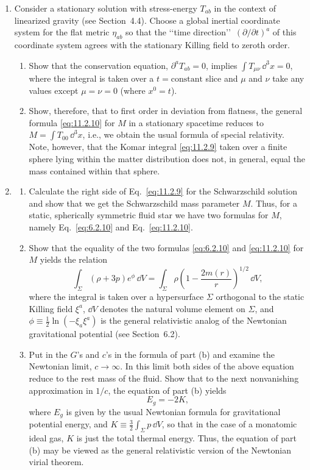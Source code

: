 \begin{enumerate}[label=\arabic*.,leftmargin=2em,itemsep=1.2ex]
\item
Consider a stationary solution with stress-energy \(T_{ab}\) in the context of
linearized gravity (see Section~4.4). Choose a global inertial coordinate system for
the flat metric \(\eta_{ab}\) so that the \lq\lq time direction\rq\rq\
\((\partial/\partial t)^a\) of this coordinate system agrees with the stationary
Killing field to zeroth order.
\begin{enumerate}[label=\alph*),leftmargin=2em,itemsep=.45ex]
\item Show that the conservation equation, \(\partial^aT_{ab}=0\), implies
\(\int T_{\mu\nu}\,\dd^3x=0\), where the integral is taken over a \(t=\text{constant}\)
slice and \(\mu\) and \(\nu\) take any values except \(\mu=\nu=0\) (where
\(x^0=t\)).
\item Show, therefore, that to first order in deviation from flatness, the general
formula \eqref{eq:11.2.10} for \(M\) in a stationary spacetime reduces to
\(M=\int T_{00}\,\dd^3x\), i.e., we obtain the usual formula of special relativity.
Note, however, that the Komar integral \eqref{eq:11.2.9} taken over a finite sphere
lying within the matter distribution does not, in general, equal the mass contained
within that sphere.
\end{enumerate}

\item
\begin{enumerate}[label=\alph*),leftmargin=2em,itemsep=.45ex]
\item Calculate the right side of Eq.~\eqref{eq:11.2.9} for the Schwarzschild
solution and show that we get the Schwarzschild mass parameter \(M\). Thus, for a
static, spherically symmetric fluid star we have two formulas for \(M\), namely
Eq.~\eqref{eq:6.2.10} and Eq.~\eqref{eq:11.2.10}.
\item Show that the equality of the two formulas \eqref{eq:6.2.10} and
\eqref{eq:11.2.10} for \(M\) yields the relation
\[
  \int_\Sigma(\rho+3p)e^\phi\,\dd V
  =\int_\Sigma\rho\left(1-\frac{2m(r)}{r}\right)^{1/2}\,\dd V,
\]
where the integral is taken over a hypersurface \(\Sigma\) orthogonal to the static
Killing field \(\xi^a\), \(\dd V\) denotes the natural volume element on \(\Sigma\), and
\(\phi\equiv\tfrac12\ln(-\xi_a\xi^a)\) is the general relativistic analog of the
Newtonian gravitational potential (see Section~6.2).
\item Put in the \(G\)'s and \(c\)'s in the formula of part (b) and examine the
Newtonian limit, \(c\to\infty\). In this limit both sides of the above equation reduce
to the rest mass of the fluid. Show that to the next nonvanishing approximation in
\(1/c\), the equation of part (b) yields
\[
  E_g=-2K,
\]
where \(E_g\) is given by the usual Newtonian formula for gravitational potential
energy, and \(K\equiv\tfrac32\int_\Sigma p\,\dd V\), so that in the case of a monatomic
ideal gas, \(K\) is just the total thermal energy. Thus, the equation of part (b) may
be viewed as the general relativistic version of the Newtonian virial theorem.
\end{enumerate}


\end{enumerate}
